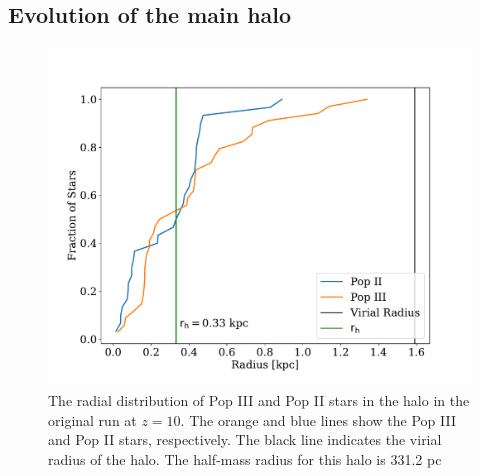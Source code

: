 \documentclass[fleqn,usenatbib]{mnras}
\begin{document}
\subsection{Evolution of the main halo} \label{sec:main_halo}
\begin{figure} 
	\includegraphics[width=\columnwidth]{plots/run_OG_stellar_dist.pdf}
	\caption[Radial distribution of Pop II and III stars in the main halo.]{The radial distribution of Pop III and Pop II stars in the halo in the original run at $z = 10$. The orange and blue lines show the Pop III and Pop II stars, respectively. The black line indicates the virial radius of the halo. The half-mass radius for this halo is 331.2 pc}
	\label{fig:og_stellarmass}
\end{figure}
\end{document}
